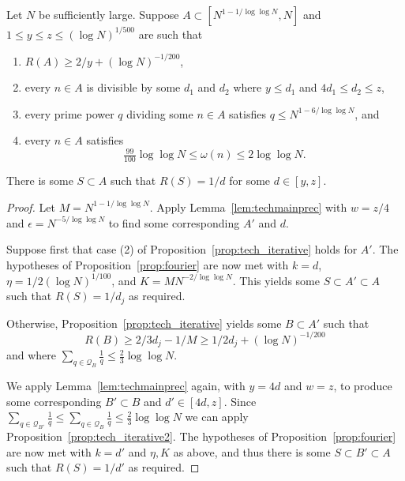 \begin{proposition}\label{prop:techmain}
\leanok
{}
Let $N$ be sufficiently large. Suppose $A\subset [N^{1-1/\log\log N},N]$ and $1\leq y\leq z\leq (\log N)^{1/500}$ are such that
\begin{enumerate}
\item $R(A)\geq 2/y+(\log N)^{-1/200}$,
\item every $n\in A$ is divisible by some $d_1$ and $d_2$ where $y\leq d_1$ and $4d_1\leq d_2\leq z$,
\item every prime power $q$ dividing some $n\in A$ satisfies $q\leq N^{1-6/\log\log N}$, and
\item every $n\in A$ satisfies
\[\tfrac{99}{100}\log\log N\leq \omega(n) \leq 2\log\log N.\]
\end{enumerate}
There is some $S\subset A$ such that $R(S)=1/d$ for some $d\in [y,z]$.
\end{proposition}
\begin{proof}
\leanok
{}
Let $M=N^{1-1/\log\log N}$. Apply Lemma~\ref{lem:techmainprec} with $w=z/4$ and $\epsilon=N^{-5/\log\log N}$ to find some corresponding $A'$ and $d$.

Suppose first that case (2) of Proposition~\ref{prop:tech_iterative} holds for $A'$. The hypotheses of Proposition~\ref{prop:fourier} are now met with $k=d$, $\eta=1/2(\log N)^{1/100}$, and $K=MN^{-2/\log \log N}$. This yields some $S\subset A'\subset A$ such that $R(S)=1/d_j$ as required.

Otherwise, Proposition~\ref{prop:tech_iterative} yields some $B\subset A'$ such that
\[R(B)\geq 2/3d_j-1/M\geq 1/2d_j+(\log N)^{-1/200}\]
and where $\sum_{q\in\mathcal{Q}_B}\frac{1}{q}\leq \frac{2}{3}\log\log N$.

We apply Lemma~\ref{lem:techmainprec} again, with $y=4d$ and $w=z$, to produce some corresponding $B'\subset B$ and $d'\in [4d,z]$. Since $\sum_{q\in \mathcal{Q}_{B'}}\frac{1}{q}\leq \sum_{q\in\mathcal{Q}_B}\frac{1}{q}\leq \frac{2}{3}\log\log N$ we can apply Proposition~\ref{prop:tech_iterative2}. The hypotheses of Proposition~\ref{prop:fourier} are now met with $k=d'$ and $\eta,K$ as above, and thus there is some $S\subset B'\subset A$ such that $R(S)=1/d'$ as required.
\end{proof}

